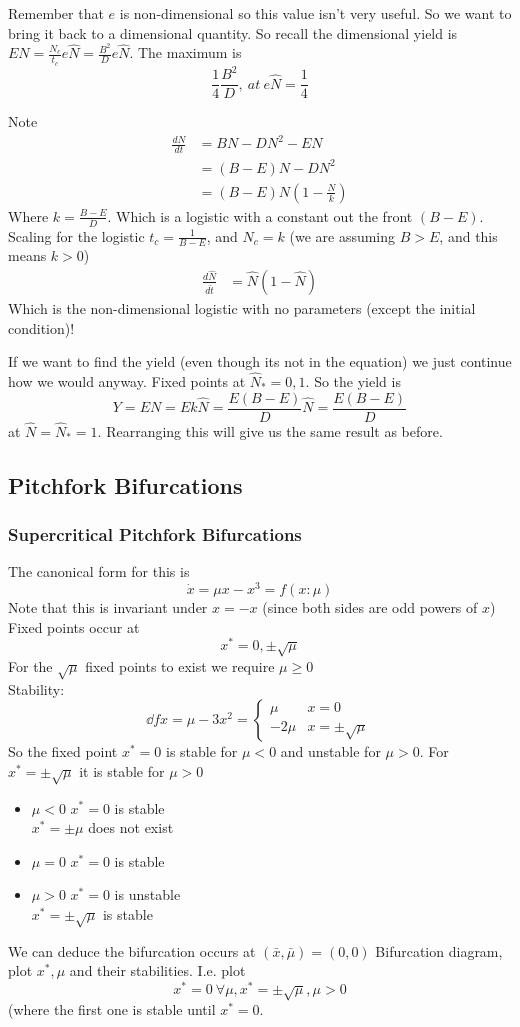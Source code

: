 \documentclass{/home/janmebows/Documents/LatexTemplates/myassignment}
\begin{document}
Remember that $e$ is non-dimensional so this value isn't very useful. So we want to bring it back to a dimensional quantity. So recall the dimensional yield is $EN = \frac{N_c}{t_c} e\hat{N} = \frac{B^2}{D} e \hat{N}$.
The maximum is
\[\frac14 \frac{B^2}{D}, \ at \ e\hat{N} = \frac14\]


Note
\begin{align*}
\frac{dN}{dt} &= BN - DN^2 - EN\\
&= (B-E)N - DN^2\\
&= (B-E)N(1- \frac{N}{k})
\end{align*}
Where $k = \frac{B-E}{D}$. Which is a logistic with a constant out the front $(B-E)$. Scaling for the logistic $t_c = \frac{1}{B-E}$, and $N_c = k$ (we are assuming $B > E$, and this means $k > 0$)
\begin{align*}
    \frac{d\hat{N}}{d\hat{t}} &= \hat{N}(1-\hat{N})
\end{align*}
Which is the non-dimensional logistic with no parameters (except the initial condition)!

If we want to find the yield (even though its not in the equation) we just continue how we would anyway.
Fixed points at $\hat{N}_* = 0,1$. So the yield is 
\[Y= EN = Ek\hat{N} = \frac{E(B-E)}{D} \hat{N} = \frac{E(B-E)}{D} \]
at $\hat{N} = \hat{N}_* = 1$. Rearranging this will give us the same result as before.

\subsection{Pitchfork Bifurcations}

\subsubsection{Supercritical Pitchfork Bifurcations}
The canonical form for this is
\[\dot{x} = \mu x - x^3 = f(x:\mu)\]
Note that this is invariant under $x = -x$ (since both sides are odd powers of $x$)
Fixed points occur at
\[x^* = 0, \pm \sqrt{\mu}\]
For the $\sqrt{\mu}$ fixed points to exist we require $\mu \geq 0$\\
Stability:
\[\dd fx = \mu - 3x^2 = \begin{cases}\mu & x=0\\ -2\mu & x=\pm\sqrt{\mu}\end{cases}\]
So the fixed point $x^* = 0$ is stable for $\mu < 0$ and unstable for $\mu >0$. For $x^* = \pm \sqrt{\mu}$ it is stable for $\mu > 0$
\begin{itemize}
    \item $\mu < 0$
    $x^* = 0$ is stable\\
    $x^* = \pm \mu$ does not exist
    \item $\mu = 0$
    $x^* = 0$ is stable
    \item $\mu > 0$
    $x^* =0 $ is unstable\\
    $x^* = \pm \sqrt{\mu}$ is stable
\end{itemize}
We can deduce the bifurcation occurs at $(\bar{x},\bar{\mu}) = (0,0)$
Bifurcation diagram, plot $x^*,\mu$ and their stabilities.
I.e. plot
\[x^* = 0\ \forall \mu, x^* = \pm\sqrt{\mu}, \mu >0\]
(where the first one is stable until $x^*=0$.
\end{document}
